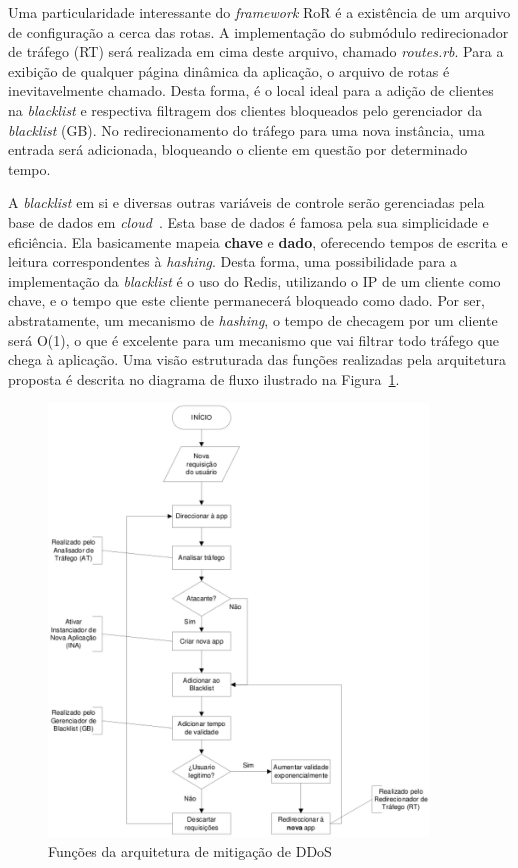 Uma particularidade interessante do \emph{framework} RoR é a existência de um arquivo de configuração a cerca das rotas. A implementação do submódulo redirecionador de tráfego (RT) será realizada em cima deste arquivo, chamado \emph{routes.rb}. Para a exibição de qualquer página dinâmica da aplicação, o arquivo de rotas é inevitavelmente chamado. Desta forma, é o local ideal para a adição de clientes na \emph{blacklist} e respectiva filtragem dos clientes bloqueados pelo gerenciador da \emph{blacklist} (GB). No redirecionamento do tráfego para uma nova instância, uma entrada será adicionada, bloqueando o cliente em questão por determinado tempo.

A \emph{blacklist} em si e diversas outras variáveis de controle serão gerenciadas pela base de dados em \emph{cloud}~\cite{redis}. Esta base de dados é famosa pela sua simplicidade e eficiência. Ela basicamente mapeia \textbf{chave} e \textbf{dado}, oferecendo tempos de escrita e leitura correspondentes à \emph{hashing}. Desta forma, uma possibilidade para a implementação da \emph{blacklist} é o uso do Redis, utilizando o IP de um cliente como chave, e o tempo que este cliente permanecerá bloqueado como dado. Por ser, abstratamente, um mecanismo de \emph{hashing}, o tempo de checagem por um cliente será O(1), o que é excelente para um mecanismo que vai filtrar todo tráfego que chega à aplicação. Uma visão estruturada das funções realizadas pela arquitetura proposta é descrita no diagrama de fluxo ilustrado na Figura~\ref{fig:dfd}.

\begin{figure}[t!]
	\centering
	\includegraphics[width=0.90\textwidth]{images/dfd.eps}
	\hskip 1cm
	\caption{Funções da arquitetura de mitigação de DDoS}
	\label{fig:dfd}
\end{figure}



